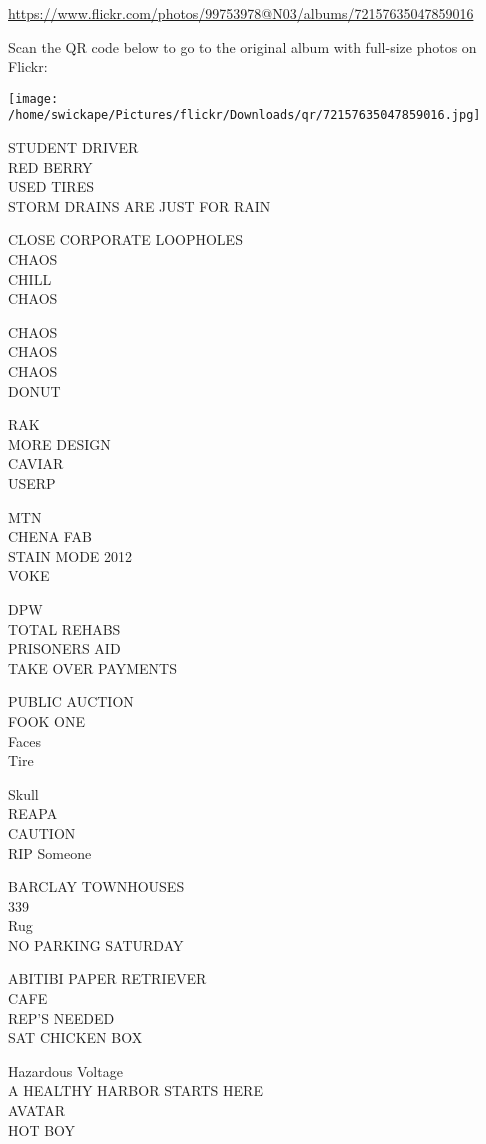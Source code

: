 \documentclass[10pt,letterpaper]{article}
\begin{document}
\url{https://www.flickr.com/photos/99753978@N03/albums/72157635047859016}

Scan the QR code below to go to the original album with full-size photos on Flickr:

\texttt{[image: /home/swickape/Pictures/flickr/Downloads/qr/72157635047859016.jpg]}


STUDENT DRIVER\\
RED BERRY\\
USED TIRES\\
STORM DRAINS ARE JUST FOR RAIN

CLOSE CORPORATE LOOPHOLES\\
CHAOS\\
CHILL\\
CHAOS

CHAOS\\
CHAOS\\
CHAOS\\
DONUT

RAK\\
MORE DESIGN\\
CAVIAR\\
USERP

MTN\\
CHENA FAB\\
STAIN MODE 2012\\
VOKE

DPW\\
TOTAL REHABS\\
PRISONERS AID\\
TAKE OVER PAYMENTS

PUBLIC AUCTION\\
FOOK ONE\\
Faces\\
Tire

Skull\\
REAPA\\
CAUTION\\
RIP Someone

BARCLAY TOWNHOUSES\\
339\\
Rug\\
NO PARKING SATURDAY

ABITIBI PAPER RETRIEVER\\
CAFE\\
REP'S NEEDED\\
SAT CHICKEN BOX

Hazardous Voltage\\
A HEALTHY HARBOR STARTS HERE\\
AVATAR\\
HOT BOY
\end{document}
